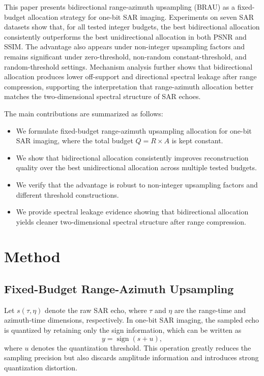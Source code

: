 \documentclass[conference]{IEEEtran}
\begin{document}
This paper presents bidirectional range-azimuth upsampling (BRAU) as a fixed-budget allocation strategy for one-bit SAR imaging. Experiments on seven SAR datasets show that, for all tested integer budgets, the best bidirectional allocation consistently outperforms the best unidirectional allocation in both PSNR and SSIM. The advantage also appears under non-integer upsampling factors and remains significant under zero-threshold, non-random constant-threshold, and random-threshold settings. Mechanism analysis further shows that bidirectional allocation produces lower off-support and directional spectral leakage after range compression, supporting the interpretation that range-azimuth allocation better matches the two-dimensional spectral structure of SAR echoes.

The main contributions are summarized as follows:
\begin{itemize}
    \item We formulate fixed-budget range-azimuth upsampling allocation for one-bit SAR imaging, where the total budget $Q=R\times A$ is kept constant.
    \item We show that bidirectional allocation consistently improves reconstruction quality over the best unidirectional allocation across multiple tested budgets.
    \item We verify that the advantage is robust to non-integer upsampling factors and different threshold constructions.
    \item We provide spectral leakage evidence showing that bidirectional allocation yields cleaner two-dimensional spectral structure after range compression.
\end{itemize}

\section{Method}

\subsection{Fixed-Budget Range-Azimuth Upsampling}

Let $s(\tau,\eta)$ denote the raw SAR echo, where $\tau$ and $\eta$ are the range-time and azimuth-time dimensions, respectively. In one-bit SAR imaging, the sampled echo is quantized by retaining only the sign information, which can be written as
\begin{equation}
    y = \operatorname{sign}(s + u),
\end{equation}
where $u$ denotes the quantization threshold. This operation greatly reduces the sampling precision but also discards amplitude information and introduces strong quantization distortion.
\end{document}
